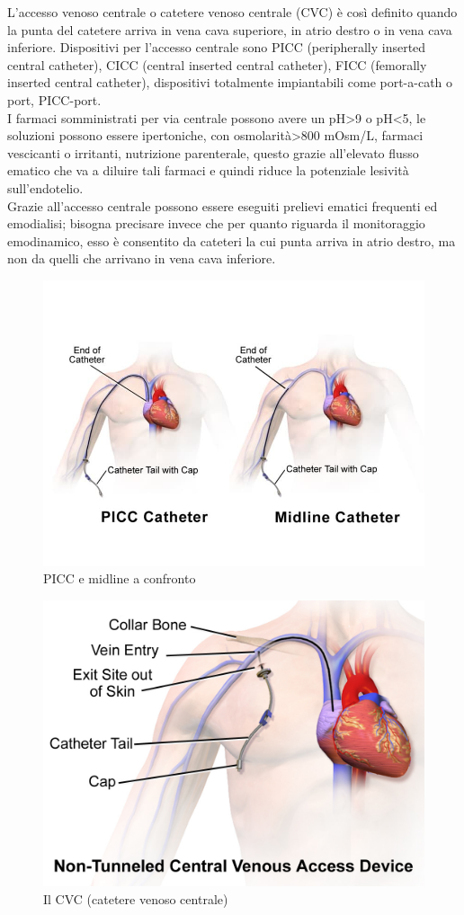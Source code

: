 L’accesso venoso centrale o catetere venoso centrale (CVC) è così definito quando la punta del catetere arriva in 
vena cava superiore, in atrio destro o in vena cava inferiore. Dispositivi per l’accesso centrale sono PICC 
(peripherally inserted central catheter), CICC (central inserted central catheter), 
FICC (femorally inserted central catheter), dispositivi totalmente impiantabili come port-a-cath o port, PICC-port\cite{GAVECELTracc2021}.\\
I farmaci somministrati per via centrale possono avere un pH>9 o pH<5, le soluzioni possono essere ipertoniche, con 
osmolarità>800 mOsm/L, farmaci vescicanti o irritanti, nutrizione parenterale, %
questo grazie all’elevato flusso ematico che va a diluire tali farmaci e quindi riduce 
la potenziale lesività sull’endotelio\cite{GAVECELTracc2021}.\\
Grazie all’accesso centrale possono essere eseguiti prelievi ematici frequenti ed emodialisi; bisogna precisare 
invece che per quanto riguarda il monitoraggio emodinamico, esso è consentito da cateteri 
la cui punta arriva in atrio destro, ma non da quelli che arrivano in vena cava inferiore\cite{GAVECELTracc2021}.\\

\begin{figure}[H]
    \begin{center}
    \includegraphics[width=0.6\columnwidth]{img/picc.jpeg}
    \end{center}
    \caption[PICC e midline a confronto]{PICC e midline a confronto
    \cite{img40}}

\end{figure}

\begin{figure}[H]
    \begin{center}
    \includegraphics[width=0.5\columnwidth]{img/CVC.png}
    \end{center}
    \caption[Il CVC (catetere venoso centrale)]{Il CVC (catetere venoso centrale)
    \cite{img41}}

\end{figure}

